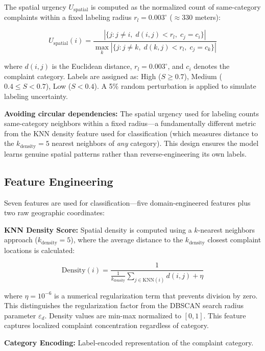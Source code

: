 \documentclass[12pt,onecolumn,draftclsnofoot]{IEEEtran}
\begin{document}
The spatial urgency $U_{\text{spatial}}$ is computed as the normalized count of same-category complaints within a fixed labeling radius $r_l = 0.003^{\circ}$ ($\approx$330 meters):

\begin{equation}
U_{\text{spatial}}(i) = \frac{|\{j : j \neq i, \; d(i,j) < r_l, \; c_j = c_i\}|}{\max_k |\{j : j \neq k, \; d(k,j) < r_l, \; c_j = c_k\}|}
\end{equation}

where $d(i,j)$ is the Euclidean distance, $r_l = 0.003^{\circ}$, and $c_i$ denotes the complaint category. Labels are assigned as: High ($S \geq 0.7$), Medium ($0.4 \leq S < 0.7$), Low ($S < 0.4$). A 5\% random perturbation is applied to simulate labeling uncertainty.

\textbf{Avoiding circular dependencies:} The spatial urgency used for labeling counts same-category neighbors within a fixed radius---a fundamentally different metric from the KNN density feature used for classification (which measures distance to the $k_{\text{density}}=5$ nearest neighbors of \textit{any} category). This design ensures the model learns genuine spatial patterns rather than reverse-engineering its own labels.

\subsection{Feature Engineering}

Seven features are used for classification---five domain-engineered features plus two raw geographic coordinates:

\textbf{KNN Density Score:} Spatial density is computed using a $k$-nearest neighbors approach ($k_{\text{density}}=5$), where the average distance to the $k_{\text{density}}$ closest complaint locations is calculated:

\begin{equation}
\text{Density}(i) = \frac{1}{\frac{1}{k_{\text{density}}}\sum_{j \in \text{KNN}(i)} d(i,j) + \eta}
\end{equation}

where $\eta = 10^{-6}$ is a numerical regularization term that prevents division by zero. This distinguishes the regularization factor from the DBSCAN search radius parameter $\varepsilon_d$. Density values are min-max normalized to $[0, 1]$. This feature captures localized complaint concentration regardless of category.

\textbf{Category Encoding:} Label-encoded representation of the complaint category.
\end{document}
